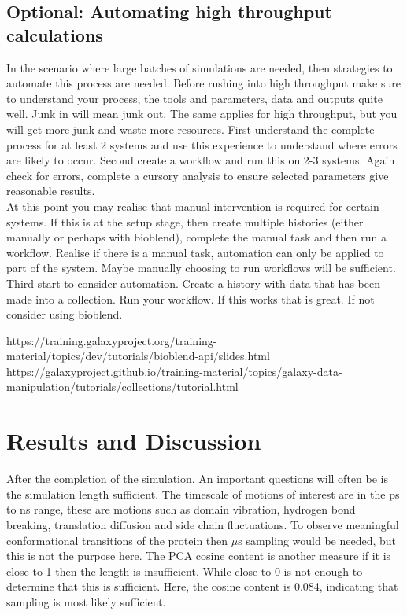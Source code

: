 \documentclass[twocolumn]{bmcart}%
\begin{document}
\hypertarget{optional-automating-high-throughput-calculations}{%
\subsection*{Optional: Automating high throughput
calculations}\label{optional-automating-high-throughput-calculations}}

In the scenario where large batches of simulations are needed, then
strategies to automate this process are needed. Before rushing into high
throughput make sure to understand your process, the tools and
parameters, data and outputs quite well. Junk in will mean junk out. The
same applies for high throughput, but you will get more junk and waste
more resources. First understand the complete process for at least 2
systems and use this experience to understand where errors are likely to
occur. Second create a workflow and run this on 2-3 systems. Again check
for errors, complete a cursory analysis to ensure selected parameters
give reasonable results.\\
At this point you may realise that manual intervention is required for
certain systems. If this is at the setup stage, then create multiple
histories (either manually or perhaps with bioblend), complete the
manual task and then run a workflow. Realise if there is a manual task,
automation can only be applied to part of the system. Maybe manually
choosing to run workflows will be sufficient. Third start to consider
automation. Create a history with data that has been made into a
collection. Run your workflow. If this works that is great. If not
consider using bioblend.

https://training.galaxyproject.org/training-material/topics/dev/tutorials/bioblend-api/slides.html
https://galaxyproject.github.io/training-material/topics/galaxy-data-manipulation/tutorials/collections/tutorial.html

\hypertarget{resultsanddiscussion}{%
\section*{Results and Discussion}\label{resultsanddiscussion}}
After the completion of the simulation. An important questions will often be is the simulation length sufficient. The timescale of motions of interest are in the ps to ns range, these are motions such as domain vibration, hydrogen bond breaking, translation diffusion and side chain fluctuations. To observe meaningful conformational transitions of the protein then $\mu$s sampling would be needed, but this is not the purpose here. The PCA cosine content is another measure if it is close to 1 then the length is insufficient. While close to 0 is not enough to determine that this is sufficient. Here, the cosine content is 0.084, indicating that sampling is most likely sufficient.
\end{document}
